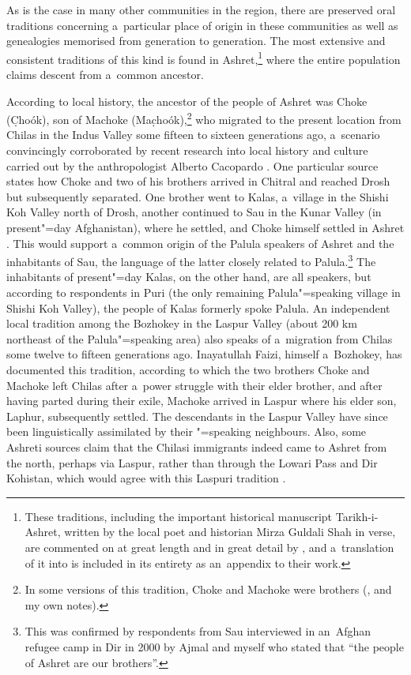 \largerpage[-1]
As is the case in many other communities in the region, there are preserved oral traditions concerning a~particular place of origin in these communities as well as genealogies memorised from generation to generation. The most extensive and consistent traditions of this kind is found in Ashret,\footnote{These traditions, including the important historical manuscript Tarikh-i-Ashret, written by the local poet and historian Mirza Guldali Shah in \iliPersian verse, are commented on at great length and in great detail by \citet[79--143]{cacopardo2001}, and a~translation of it into \iliEnglish is included in its entirety as an~appendix to their work.} where the entire population claims descent from a~common ancestor. 


According to local history, the ancestor of the people of Ashret was Choke (C̣hoók), son of
Machoke (Mac̣hoók),\footnote{In some versions of this tradition, Choke and Machoke were brothers
  (\citealt[85]{cacopardo2001}, and my own notes).} who migrated to the present location from
Chilas in the Indus Valley some fifteen to sixteen generations ago, a~scenario convincingly corroborated by
recent research into local history and culture carried out by the anthropologist Alberto Cacopardo
\citep[84--93]{cacopardo2001}. One particular source states how Choke and two of his brothers
arrived in Chitral and reached Drosh but subsequently separated. One brother went to Kalas,
a~village in the Shishi Koh Valley north of Drosh, another continued to Sau in the Kunar Valley (in
present"=day Afghanistan), where he settled, and Choke himself settled in Ashret
\citep[84]{cacopardo2001}. This would support a~common origin of the Palula speakers of Ashret and
the inhabitants of Sau, the language of the latter closely related to Palula.\footnote{This was
  confirmed by respondents from Sau interviewed in an~Afghan refugee camp in Dir in 2000 by Ajmal
  \iliNuristani and myself who stated that ``the people of Ashret are our brothers''.} The inhabitants
of present"=day Kalas, on the other hand, are all \iliKhowar speakers, but according to respondents in
Puri (the only remaining Palula"=speaking village in Shishi Koh Valley), the people of Kalas formerly
spoke Palula. An independent local tradition among the Bozhokey in the Laspur Valley (about 200 km
northeast of the Palula"=speaking area) also speaks of a~migration from Chilas some twelve to fifteen
generations ago. Inayatullah Faizi, himself a~Bozhokey, has documented this tradition, according
to which the two brothers Choke and Machoke left Chilas after a~power struggle with their elder
brother, and after having parted during their exile, Machoke arrived in Laspur where his elder son,
Laphur, subsequently settled. The descendants in the Laspur Valley have since been linguistically
assimilated by their \iliKhowar"=speaking neighbours. Also, some Ashreti sources claim that the Chilasi
immigrants indeed came to Ashret from the north, perhaps via Laspur, rather than through the Lowari
Pass and Dir Kohistan, which would agree with this Laspuri tradition \citep[85, 125--126]{cacopardo2001}.


